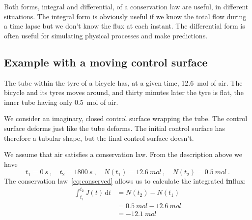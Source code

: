 \documentclass[a4paper,12pt,%
onecolumn,oneside,titlepage,%
british%
]{memoir}
\newcommand*{\di}{\mathrm{d}}%
\renewcommand*{\|}[1][]{\nonscript\:#1\vert\nonscript\:\mathopen{}}
\newcommand*{\yN}{N}
\newcommand*{\yJ}{J}
\begin{document}
Both forms, integral and differential, of a conservation law are useful, in different situations. The integral form is obviously useful if we know the total flow during a time lapse but we don't know the flux at each instant. The differential form is often useful for simulating physical processes and make predictions.

\subsection{Example with a moving control surface}
\label{sec:example_conservation_moving}

%
The tube within the tyre of a bicycle has, at a given time, \qty{12.6}{mol} of air.
The bicycle and its tyres moves around, and thirty minutes later the tyre is flat, the inner tube having only \qty{0.5}{mol} of air.

We consider an imaginary, closed control surface wrapping the tube. The control surface deforms just like the tube deforms. The initial control surface has therefore a tubular shape, but the final control surface doesn't.

We assume that air satisfies a conservation law. From the description above we have
\begin{equation*}
  t_{1}=\qty{0}{s} \ ,\quad
  t_{2}=\qty{1800}{s} \ ,\quad
  \yN(t_{1})=\qty{12.6}{mol} \ ,\quad
  \yN(t_{2})=\qty{0.5}{mol} \ .
\end{equation*}
The conservation law~\eqref{eq:conserved} allows us to calculate the integrated \textbf{in}flux:
\begin{equation*}
  \begin{split}
    \int_{t_{1}}^{t_{2}}\!\!\yJ(t)\,\di t &= \yN(t_{2}) - \yN(t_{1})
    \\&= \qty{0.5}{mol} - \qty{12.6}{mol}
    \\&= \qty{-12.1}{mol}
  \end{split}
\end{equation*}
\end{document}
